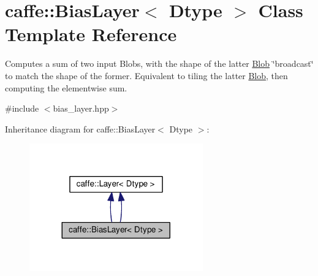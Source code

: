 \hypertarget{classcaffe_1_1_bias_layer}{}\section{caffe\+:\+:Bias\+Layer$<$ Dtype $>$ Class Template Reference}
\label{classcaffe_1_1_bias_layer}


Computes a sum of two input Blobs, with the shape of the latter \mbox{\hyperlink{classcaffe_1_1_blob}{Blob}} \char`\"{}broadcast\char`\"{} to match the shape of the former. Equivalent to tiling the latter \mbox{\hyperlink{classcaffe_1_1_blob}{Blob}}, then computing the elementwise sum.  




{\ttfamily \#include $<$bias\+\_\+layer.\+hpp$>$}



Inheritance diagram for caffe\+:\+:Bias\+Layer$<$ Dtype $>$\+:
\nopagebreak
\begin{figure}[H]
\begin{center}
\leavevmode
\includegraphics[width=212pt]{classcaffe_1_1_bias_layer__inherit__graph}
\end{center}
\end{figure}
